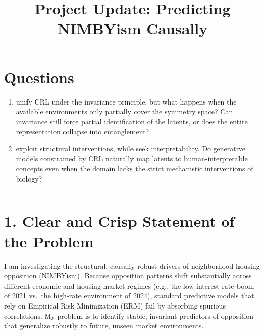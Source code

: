 \documentclass[11pt]{article}
\begin{document}
\section*{Questions}
\begin{enumerate}
    \item \citet{yao2024unifying} unify CRL under the invariance principle, but what happens when the available environments only partially cover the symmetry space? Can invariance still force partial identification of the latents, or does the entire representation collapse into entanglement?
    \item \citet{uhler2025causal} exploit structural interventions, while \citet{moran2025towards} seek interpretability. Do generative models constrained by CRL naturally map latents to human-interpretable concepts even when the domain lacks the strict mechanistic interventions of biology?
\end{enumerate}

\newpage
\title{\vspace{-2em}\textbf{Project Update: Predicting NIMBYism Causally}}
\vspace{0.5em}
\hrule
\vspace{0.5em}

\section*{1. Clear and Crisp Statement of the Problem}
I am investigating the structural, causally robust drivers of neighborhood housing opposition (NIMBYism). Because opposition patterns shift substantially across different economic and housing market regimes (e.g., the low-interest-rate boom of 2021 vs.\ the high-rate environment of 2024), standard predictive models that rely on Empirical Risk Minimization (ERM) fail by absorbing spurious correlations. My problem is to identify stable, invariant predictors of opposition that generalize robustly to future, unseen market environments.
\end{document}
